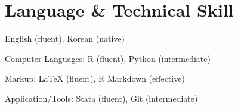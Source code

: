 \section{Language \& Technical Skill}

\begin{aka}[noitemsep]

    \item [] English (fluent), Korean (native)

    \item [] Computer Languages: R (fluent), Python (intermediate)

    \item [] Markup: \LaTeX{} (fluent), R Markdown (effective)

    \item [] Application/Tools: Stata (fluent), Git (intermediate)

\end{aka}
